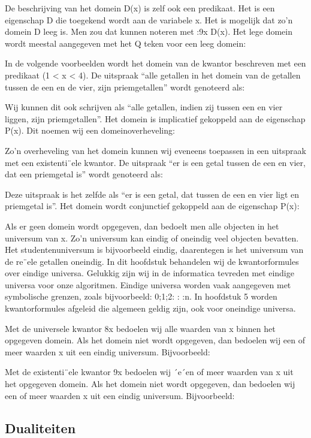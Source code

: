 \documentclass{article}
\begin{document}
	
	De beschrijving van het domein D(x) is zelf ook een predikaat. Het is een eigenschap D
	die toegekend wordt aan de variabele x. Het is mogelijk dat zo’n domein D leeg is. Men
	zou dat kunnen noteren met :9x D(x). Het lege domein wordt meestal aangegeven met
	het Q teken voor een leeg domein:
	
	In de volgende voorbeelden wordt het domein van de kwantor beschreven met een predikaat
	(1 < x < 4). De uitspraak “alle getallen in het domein van de getallen tussen de een
	en de vier, zijn priemgetallen” wordt genoteerd als:
	
	Wij kunnen dit ook schrijven als “alle getallen, indien zij tussen een en vier liggen, zijn
	priemgetallen”. Het domein is implicatief gekoppeld aan de eigenschap P(x). Dit noemen
	wij een domeinoverheveling:
	
	Zo’n overheveling van het domein kunnen wij eveneens toepassen in een uitspraak met
	een existenti¨ele kwantor. De uitspraak “er is een getal tussen de een en vier, dat een
	priemgetal is” wordt genoteerd als:
	
	Deze uitspraak is het zelfde als “er is een getal, dat tussen de een en vier ligt en priemgetal
	is”. Het domein wordt conjunctief gekoppeld aan de eigenschap P(x):
	
	
	Als er geen domein wordt opgegeven, dan bedoelt men alle objecten in het universum van
	x. Zo’n universum kan eindig of oneindig veel objecten bevatten. Het studentenuniversum
	is bijvoorbeeld eindig, daarentegen is het universum van de re¨ele getallen oneindig.
	In dit hoofdstuk behandelen wij de kwantorformules over eindige universa. Gelukkig zijn
	wij in de informatica tevreden met eindige universa voor onze algoritmen. Eindige universa
	worden vaak aangegeven met symbolische grenzen, zoals bijvoorbeeld: 0;1;2: : :n.
	In hoofdstuk 5 worden kwantorformules afgeleid die algemeen geldig zijn, ook voor oneindige
	universa.
	
	Met de universele kwantor 8x bedoelen wij alle waarden van x binnen het opgegeven
	domein. Als het domein niet wordt opgegeven, dan bedoelen wij een of meer waarden x
	uit een eindig universum. Bijvoorbeeld:
	
	
	Met de existenti¨ele kwantor 9x bedoelen wij ´e´en of meer waarden van x uit het opgegeven
	domein. Als het domein niet wordt opgegeven, dan bedoelen wij een of meer waarden x
	uit een eindig universum. Bijvoorbeeld:
	
	
	
	
	
	\subsection{Dualiteiten}
	
\end{document}

